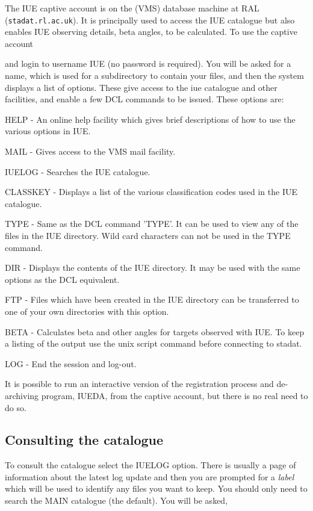 \documentclass[11pt,twoside,nolof,noabs]{starlink}
\begin{document}
The IUE captive account is on the (VMS) database machine at RAL
(\texttt{stadat.rl.ac.uk}).
It is principally used to access the IUE catalogue but also enables IUE
observing details, beta angles, to be calculated.
To use the captive account

\begin{terminalv}
\end{terminalv}

and login to username IUE (no password is required).
You will be asked for a name, which is used for a subdirectory to contain your
files, and then the system displays a list of options. These give access to the
iue catalogue and other
facilities, and enable a few DCL commands to be issued.
These options are:

HELP - An online help facility which gives brief descriptions of how to use
the various options in IUE.

MAIL - Gives access to the VMS mail facility.

IUELOG - Searches the IUE catalogue.

CLASSKEY - Displays a list of the various classification codes used in the
IUE catalogue.

TYPE - Same as the DCL command 'TYPE'.
It can be used to view any of the files in the IUE directory.
Wild card characters can not be used in the TYPE command.

DIR - Displays the contents of the IUE directory.
It may be used with the same options as the DCL equivalent.

FTP - Files which have been created in the IUE directory can be
transferred to one of your own directories with this option.

BETA - Calculates beta and other angles for targets observed with IUE. To keep
a listing of the output use the unix script command before connecting to
stadat.

LOG - End the session and log-out.

It is possible to run an interactive version of the registration process and
de-archiving program, IUEDA, from the captive account, but there is no real
need to do so.

\subsection {Consulting the catalogue}

To consult the catalogue select the IUELOG option.
There is usually a page of information about the latest log update and then
you are prompted for a \textit{label} which will be used to identify any files you
want to keep.
You should only need to search the MAIN catalogue (the default).
You will be asked,
\end{document}
